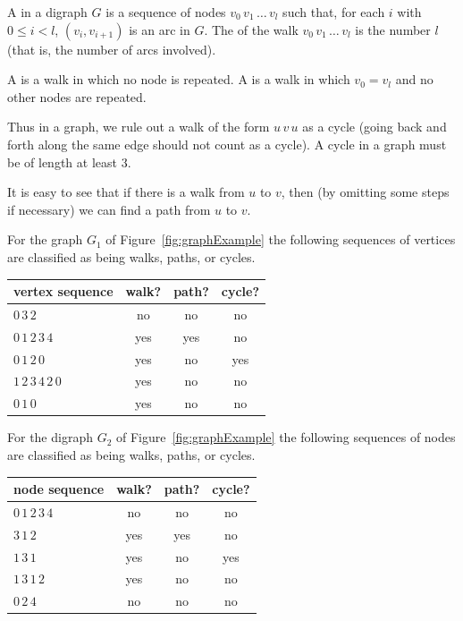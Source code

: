 \begin{Definition} 
A  in a digraph $G$ is a sequence of nodes $v_0\, v_1\,
\ldots\, v_l$ such that, for each $i$ with $0 \leq i < l$, $(v_i,
v_{i+1})$ is an arc in $G$. The  of the walk $v_0\, v_1\,
\ldots \,v_l$ is the number $l$ (that is, the number of arcs involved).

A  is a walk in which no node is repeated. A
 is a walk in which $v_0 = v_l$ and no other nodes
are repeated.
\end{Definition}

Thus in a graph, we rule out a walk of the form $u\, v\, u$ as a
cycle (going back and forth along the same edge should not count as a
cycle). A cycle in a graph must be of length at least $3$.

It is easy to see that if there is a walk from $u$ to $v$, then
(by omitting some steps if necessary) we can find a path from $u$ to $v$.


\begin{Example}
For the graph $G_1$ of Figure~\ref{fig:graphExample} the following
sequences of vertices are classified as being walks, paths, or cycles.

\medskip

\begin{center}
\begin{tabular}{|l|c|c|c|}\hline
\textbf{vertex sequence} & \textbf{walk?} & \textbf{path?} & \textbf{cycle?} \\ \hline
$0\, 3\, 2$ & no & no & no  \\
$0\, 1\, 2\, 3\, 4$ & yes & yes & no  \\
$0\, 1\,  2\,  0$ & yes & no & yes  \\
$1\,  2\,  3\,  4\,  2\,  0$ & yes & no & no \\
$0 \, 1\,  0$ & yes & no & no \\
\hline
\end{tabular}
\end{center}
\end{Example}


\begin{Example}
For the digraph $G_2$ of Figure~\ref{fig:graphExample} the following
sequences of nodes are classified as being walks, paths, or cycles.

\medskip


\begin{center}
\begin{tabular}{|l|c|c|c|}\hline
\textbf{node sequence} & \textbf{walk?} & \textbf{path?} &
\textbf{cycle?} \\ \hline
$0\,  1\,  2\,  3\,  4$ & no & no & no  \\
$3\,  1\,  2$ & yes & yes & no \\
$1\,  3\,  1$ & yes & no & yes \\
$1\, 3\, 1\, 2$ & yes & no & no \\
$0\,  2\,  4$ & no & no & no \\
\hline
\end{tabular}
\end{center}
\end{Example}


